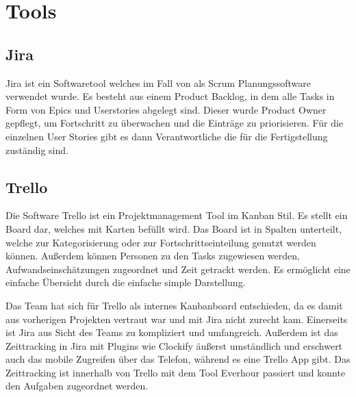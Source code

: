 
%


\section{Tools}\label{sec:tools}

\renewcommand{\kapitelautor}{Autor: Nils Hubmann} %

\subsection{Jira}\label{subsec:jira}
%

Jira ist ein Softwaretool welches im Fall von \ff als Scrum Planungssoftware verwendet wurde.
Es besteht aus einem Product Backlog, in dem alle Tasks in Form von Epics und Userstories abgelegt sind.
Dieser wurde Product Owner gepflegt, um Fortschritt zu überwachen und die Einträge zu priorisieren.
Für die einzelnen User Stories gibt es dann Verantwortliche die für die Fertigstellung zuständig sind.




\subsection{Trello}\label{subsec:Trello}
%
Die Software Trello ist ein Projektmanagement Tool im Kanban Stil. Es stellt ein Board dar, welches mit Karten befüllt wird.
Das Board ist in Spalten unterteilt, welche zur Kategorisierung oder zur Fortschrittseinteilung genutzt werden können.
Außerdem können Personen zu den Tasks zugewiesen werden, Aufwandseinschätzungen zugeordnet und Zeit getrackt werden.
Es ermöglicht eine einfache Übersicht durch die einfache simple Darstellung.

Das Team hat sich für Trello als internes Kanbanboard entschieden, da es damit aus vorherigen Projekten vertraut war und mit Jira nicht zurecht kam.
Einerseits ist Jira aus Sicht des Teams zu kompliziert und umfangreich.
Außerdem ist das Zeittracking in Jira mit Plugins wie Clockify äußerst umständlich und erschwert auch das mobile Zugreifen über das Telefon, während es eine Trello App gibt.
Das Zeittracking ist innerhalb von Trello mit dem Tool Everhour passiert und konnte den Aufgaben zugeordnet werden.
%
